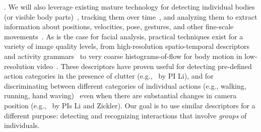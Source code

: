 . We will also leverage existing mature technology for detecting individual bodies (or visible body parts)~\cite{Dalal:HOG}, tracking them over time~\cite{}, and analyzing them to extract information about positions, velocities, pose, gestures, and other fine-scale movements~\cite{Mitra:gesture,Ryoo:action,Poppe}. As is the case for facial analysis, practical techniques exist for a variety of image quality levels, from high-resolution spatio-temporal descriptors~\cite{Dollar:STIP,Laptev:STIP,Brox:flow} and activity grammars~\cite{Niebles2007,Niebles2006} to very coarse histograms-of-flow for body motion in low-resolution video~\cite{}. These descriptors have proven useful for detecting pre-defined action categories in the presence of clutter (e.g.,~\cite{Li2010} by PI Li), and for discriminating between different categories of individual actions (e.g., walking, running, hand waving)~\cite{} even when there are substantial changes in camera position (e.g.,~\cite{LiZickler2012} by PIs Li and Zickler). Our goal is to use similar descriptors for a different purpose: detecting and recognizing interactions that involve \emph{groups} of individuals. 

